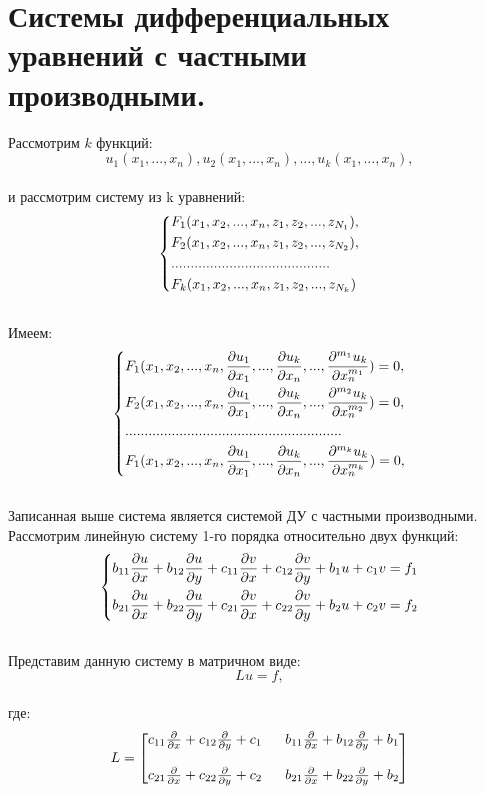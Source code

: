 \documentclass[../main.tex]{subfiles}
\begin{document}
\section{Системы дифференциальных уравнений с частными производными.}
Рассмотрим $k$ функций:
$$u_1(x_1,...,x_n),u_2(x_1,...,x_n),...,u_k(x_1,...,x_n),$$ \\
и рассмотрим систему из k уравнений: 
$$\begin{dcases}
F_1(x_1, x_2,..., x_n, z_1, z_2,..., z_{N_1}), \\
F_2(x_1, x_2,..., x_n, z_1, z_2,..., z_{N_2}), \\
......................................... \\
F_k(x_1, x_2,..., x_n, z_1, z_2,..., z_{N_k})
\end{dcases} $$ \\
Имеем:
$$\begin{dcases}
F_1(x_1, x_2,..., x_n, \frac{\partial u_1}{\partial x_1},...,\frac{\partial u_k}{\partial x_n},..., \frac{\partial ^{m_1} u_k}{\partial x^{m_1}_n}) = 0, \\
F_2(x_1, x_2,..., x_n, \frac{\partial u_1}{\partial x_1},...,\frac{\partial u_k}{\partial x_n},..., \frac{\partial ^{m_2} u_k}{\partial x^{m_2}_n}) = 0, \\
........................................................ \\
F_1(x_1, x_2,..., x_n, \frac{\partial u_1}{\partial x_1},...,\frac{\partial u_k}{\partial x_n},..., \frac{\partial ^{m_k} u_k}{\partial x^{m_k}_n}) = 0, \\
\end{dcases} $$ \\
Записанная выше система является системой ДУ с частными производными.\\
Рассмотрим линейную систему 1-го порядка относительно двух функций:\\
$$
\begin{dcases}
b_{11}\frac{\partial u}{\partial x} + b_{12}\frac{\partial u}{\partial y} + c_{11}\frac{\partial v}{\partial x} + c_{12}\frac{\partial v}{\partial y}+b_1u + c_1v = f_1 \\ 
b_{21}\frac{\partial u}{\partial x} + b_{22}\frac{\partial u}{\partial y} + c_{21}\frac{\partial v}{\partial x} + c_{22}\frac{\partial v}{\partial y}+b_2u + c_2v = f_2
\end{dcases}$$\\
Представим данную систему в матричном виде:\\
$$Lu = f,$$ \\
где:
$$
L = \begin{bmatrix}
c_{11}\pderiv{}{x} + c_{12}\pderiv{}{y} + c_1 \ & \ b_{11}\pderiv{}{x} + b_{12}\pderiv{}{y} + b_1 \\ \\ 
c_{21}\pderiv{}{x} + c_{22}\pderiv{}{y} + c_2 \ & \ b_{21}\pderiv{}{x} + b_{22}\pderiv{}{y} + b_2
\end{bmatrix}
$$ \\ 
\end{document}
